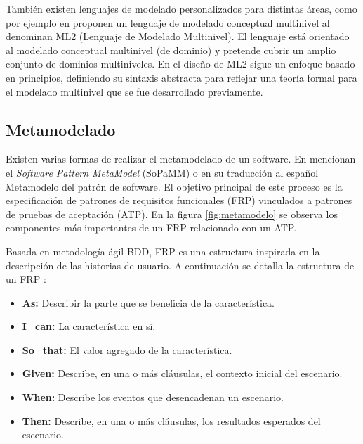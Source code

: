 También existen lenguajes de modelado personalizados para distintas áreas, como por ejemplo en \cite{Multi-level} proponen un lenguaje de modelado conceptual multinivel al denominan ML2 (Lenguaje de Modelado Multinivel). El lenguaje está orientado al modelado conceptual multinivel (de dominio) y pretende cubrir un amplio conjunto de dominios multiniveles. En el diseño de ML2 sigue un enfoque basado en principios, definiendo su sintaxis abstracta para reflejar una teoría formal para el modelado multinivel que se fue desarrollado previamente.

\subsection{Metamodelado}

Existen varias formas de realizar el metamodelado de un software. En \cite{Mohamed} mencionan el \textit{Software Pattern MetaModel} (SoPaMM) o en su traducción al español Metamodelo del patrón de software. El objetivo principal de este proceso es la especificación de patrones de requisitos funcionales (FRP) vinculados a patrones de pruebas de aceptación (ATP). En la figura \ref{fig:metamodelo} se observa los componentes más importantes de un FRP relacionado con un ATP.

Basada en metodología ágil BDD, FRP es una estructura inspirada en la descripción de las historias de usuario. A continuación se detalla la estructura de un FRP \cite{Mohamed}:

\begin{itemize}
	\item \textbf{As: }Describir la parte que se beneficia de la característica.
	\item \textbf{I\_can: }La característica en sí.
	\item \textbf{So\_that:} El valor agregado de la característica.
	\item \textbf{Given:} Describe, en una o más cláusulas, el contexto inicial del escenario.
	\item \textbf{When:} Describe los eventos que desencadenan un escenario.
	\item \textbf{Then:} Describe, en una o más cláusulas, los resultados esperados del escenario.
\end{itemize}


